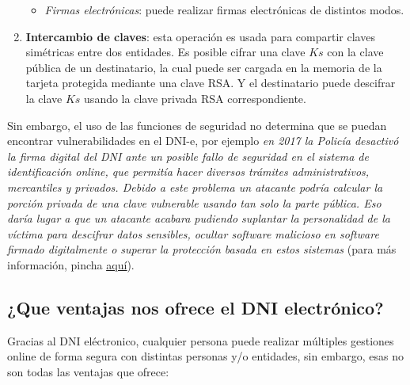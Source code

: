 \documentclass{manual}
\begin{document}
\begin{enumerate}
\begin{itemize}
		\item \textit{Firmas electrónicas}: puede realizar firmas electrónicas de distintos modos.
	\end{itemize}

	\item \textbf{Intercambio de claves}: esta operación es usada para compartir claves simétricas entre dos entidades. Es posible cifrar una clave $Ks$ con la clave pública de un destinatario, la cual puede ser cargada en la memoria de la tarjeta protegida mediante una clave RSA. Y el destinatario puede descifrar la clave $Ks$ usando la clave privada RSA correspondiente.
\end{enumerate}	

Sin embargo, el uso de las funciones de seguridad no determina que se puedan encontrar vulnerabilidades en el DNI-e, por ejemplo \textit{en 2017 la Policía desactivó la firma digital del DNI ante un posible fallo de seguridad en el sistema de identificación online, que permitía hacer diversos trámites administrativos, mercantiles y privados. Debido a este problema un atacante podría calcular la porción privada de una clave vulnerable usando tan solo la parte pública. Eso daría lugar a que un atacante acabara pudiendo suplantar la personalidad de la víctima para descifrar datos sensibles, ocultar software malicioso en software firmado digitalmente o superar la protección basada en estos sistemas} (para más información, pincha \href{https://elpais.com/politica/2017/11/09/actualidad/1510217634_470836.html}{\underline{aquí}}).




\subsection{¿Que ventajas nos ofrece el DNI electrónico?}


Gracias al DNI eléctronico, cualquier persona puede realizar múltiples gestiones online de forma segura con distintas personas y/o entidades, sin embargo, esas no son todas las ventajas que ofrece:
\end{document}
